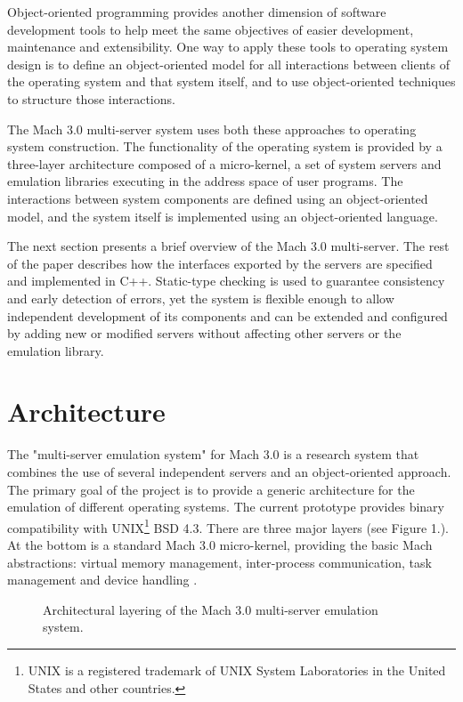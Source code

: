 Object-oriented programming provides another dimension of software
development tools to help meet the same objectives of easier
development, maintenance and extensibility. One way to apply these
tools to operating system design is to define an object-oriented model
for all interactions between clients of the operating system and that
system itself, and to use object-oriented techniques to structure
those interactions.

The Mach 3.0 multi-server system uses both these approaches to operating
system construction. The functionality of the operating system is
provided by a three-layer architecture composed of a micro-kernel, a
set of system servers and emulation libraries executing in the address
space of user programs. The interactions between system components are
defined using an object-oriented model, and the system itself is
implemented using an object-oriented language.

The next section presents a brief overview of the Mach 3.0 multi-server.
The rest of the paper describes how the interfaces exported by the
servers are specified and implemented in C++. Static-type
checking is used to guarantee consistency and early detection of
errors, yet the system is flexible enough to allow independent
development of its components and can be extended and configured by
adding new or modified servers without affecting other servers or the
emulation library.

\section{Architecture}

The "multi-server emulation system" for Mach 3.0 \cite{Usenix91} is a research
system that combines the use of several independent servers and an
object-oriented approach. The primary goal of the project is to
provide a generic architecture for the emulation of different
operating systems. The current prototype provides binary compatibility
with UNIX\footnote{UNIX is a registered trademark of UNIX System
Laboratories in the United States and other countries.} BSD 4.3. There
are three major layers (see Figure 1.). At the bottom is a standard
Mach 3.0 micro-kernel, providing the basic Mach abstractions: virtual
memory management, inter-process communication, task management and
device handling \cite{Loe90}. 

\begin{figure}[htbp]
\vspace{6cm}
{}
\caption{Architectural layering of the Mach 3.0 multi-server emulation system.}
\end{figure}

